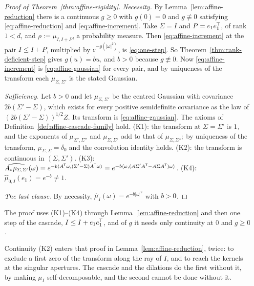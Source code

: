 \begin{proof}[Proof of Theorem~\ref{thm:affine-rigidity}]
\emph{Necessity.} By Lemma~\ref{lem:affine-reduction} there is a continuous $g \ge 0$ with $g(0) = 0$
and $g \not\equiv 0$ satisfying \ref{eq:affine-reduction} and \ref{eq:affine-increment}. Take
$\Sigma = I$ and $P = e_1e_1^{\mathsf{T}}$, of rank $1 < d$, and $\rho := \mu_{I,I+P}$, a probability
measure. Then \ref{eq:affine-increment} at the pair $I \le I + P$, multiplied by
$e^{-g(|\omega|^2)}$, is \ref{eq:one-step}. So Theorem~\ref{thm:rank-deficient-step} gives $g(u) = bu$,
and $b > 0$ because $g \not\equiv 0$. Now \ref{eq:affine-increment} is \ref{eq:affine-gaussian} for
every pair, and by uniqueness of the transform each $\mu_{\Sigma,\Sigma'}$ is the stated Gaussian.

\emph{Sufficiency.} Let $b > 0$ and let $\mu_{\Sigma,\Sigma'}$ be the centred Gaussian with
covariance $2b(\Sigma'-\Sigma)$, which exists for every positive semidefinite covariance as the law
of $(2b(\Sigma'-\Sigma))^{1/2}Z$. Its transform is \ref{eq:affine-gaussian}. The axioms of
Definition~\ref{def:affine-cascade-family} hold. (K1): the transform
at $\Sigma = \Sigma'$ is $1$, and the exponents of $\mu_{\Sigma',\Sigma''}$ and
$\mu_{\Sigma,\Sigma'}$ add to that of $\mu_{\Sigma,\Sigma''}$; by uniqueness of the transform,
$\mu_{\Sigma,\Sigma} = \delta_0$ and the convolution identity holds. (K2): the transform is
continuous in $(\Sigma,\Sigma')$. (K3): $\widehat{A_*\mu_{\Sigma,\Sigma'}}(\omega)
= e^{-b\langle A^{\mathsf{T}}\omega,(\Sigma'-\Sigma)A^{\mathsf{T}}\omega\rangle}
= e^{-b\langle\omega,(A\Sigma'A^{\mathsf{T}} - A\Sigma A^{\mathsf{T}})\omega\rangle}$. (K4):
$\widehat\mu_{0,I}(e_1) = e^{-b} \ne 1$.

\emph{The last clause.} By necessity, $\widehat\mu_I(\omega) = e^{-b|\omega|^2}$ with $b > 0$.
\end{proof}

The proof uses (K1)--(K4) through Lemma~\ref{lem:affine-reduction} and then one step of the
cascade, $I \le I + e_1e_1^{\mathsf{T}}$, and of $g$ it needs only continuity at $0$ and $g \ge 0$.

Continuity (K2) enters that proof in Lemma~\ref{lem:affine-reduction}, twice: to exclude a first zero of
the transform along the ray of $I$, and to reach the kernels at the singular apertures. The cascade and
the dilations do the first without it, by making $\mu_I$ self-decomposable, and the second cannot be
done without it.

